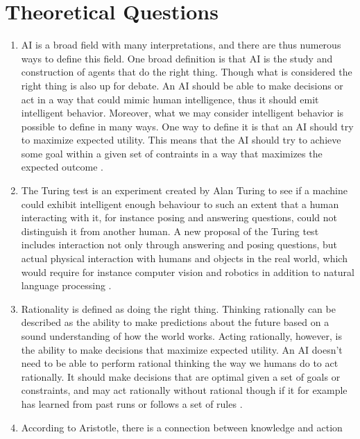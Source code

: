 \section{Theoretical Questions}

\begin{enumerate}
  \item 
    AI is a broad field with many interpretations, and there are thus 
    numerous ways to define this field. One broad definition is that AI is the 
    study and construction of agents that do the right thing. Though what is 
    considered the right thing is also up for debate. An AI should be able to 
    make decisions or act in a way that could mimic human intelligence, thus it 
    should emit intelligent behavior. Moreover, what we may consider intelligent
    behavior is possible to define in many ways. One way to define it is that an
    AI should try to maximize expected utility. This means that the AI should 
    try to achieve some goal within a given set of contraints in a way that 
    maximizes the expected outcome \autocite[pp.~7--22]{russell2021artificial}.
  \item 
    The Turing test is an experiment created by Alan Turing to see if a 
    machine could exhibit intelligent enough behaviour to such an extent that
    a human interacting with it, for instance posing and answering questions,
    could not distinguish it from another human. A new proposal of the Turing
    test includes interaction not only through answering and posing questions,
    but actual physical interaction with humans and objects in the real world,
    which would require for instance computer vision and robotics in addition
    to natural language processing \autocite[p.~23]{russell2021artificial}.
  \item 
    Rationality is defined as doing the right thing. Thinking rationally can be 
    described as the ability to make predictions about the future based on a 
    sound understanding of how the world works. Acting rationally, however, is 
    the ability to make decisions that maximize expected utility. An AI doesn't 
    need to be able to perform rational thinking the way we humans do to act 
    rationally. It should make decisions that are optimal given a set of goals 
    or constraints, and may act rationally without rational though if it for 
    example has learned from past runs or follows a set of rules 
    \autocite[pp.~19--22]{russell2021artificial}.
  \item
    According to Aristotle, there is a connection between knowledge and action

\end{enumerate}

